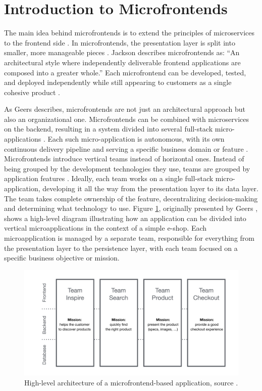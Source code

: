 \section{Introduction to Microfrontends}  
The main idea behind microfrontends is to extend the principles of microservices to the frontend side \cite{Montelius, Geers}. In microfrontends, the presentation layer is split into smaller, more manageable pieces \cite{Montelius}. Jackson \cite{Jackson} describes microfrontends as: ``An architectural style where independently deliverable frontend applications are composed into a greater whole.'' Each microfrontend can be developed, tested, and deployed independently while still appearing to customers as a single cohesive product \cite{Jackson}.

As Geers \cite{Geers} describes, microfrontends are not just an architectural approach but also an organizational one. Microfrontends can be combined with microservices on the backend, resulting in a system divided into several full-stack micro-applications \cite{Montelius}. Each such micro-application is autonomous, with its own continuous delivery pipeline and serving a specific business domain or feature \cite{Peltonen}. Microfrontends introduce vertical teams instead of horizontal ones. Instead of being grouped by the development technologies they use, teams are grouped by application features \cite{Montelius}. Ideally, each team works on a single full-stack micro-application, developing it all the way from the presentation layer to its data layer. The team takes complete ownership of the feature, decentralizing decision-making and determining what technology to use. Figure \ref{fig:microfrontends-architecture}, originally presented by Geers \cite{GeersWeb}, shows a high-level diagram illustrating how an application can be divided into vertical microapplications in the context of a simple e-shop. Each microapplication is managed by a separate team, responsible for everything from the presentation layer to the persistence layer, with each team focused on a specific business objective or mission.
\begin{figure}[h]  
  \centerline{\includegraphics[width=1\textwidth]{images/microfrontends-architecture.png}}  
  \caption[Microfrontend Architecture]{High-level architecture of a microfrontend-based application, source \cite{GeersWeb}.}  
  \label{fig:microfrontends-architecture}  
\end{figure}